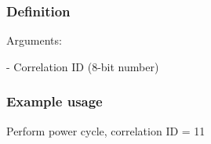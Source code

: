 \subsubsection{Definition}

Arguments: 
\begin{description}[labelindent=1cm]
	\item[\texttt{correlation\_id}] - Correlation ID (8-bit number)
\end{description}

\subsubsection{Example usage}
Perform power cycle, correlation ID = 11

